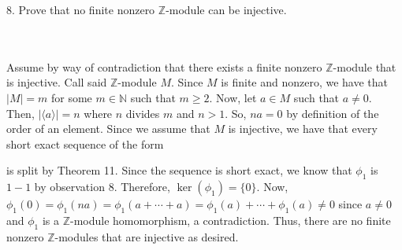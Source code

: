 8. Prove that no finite nonzero $\mathbb{Z}$-module can be injective.\\\\

\begin{solution}\renewcommand{\qedsymbol}{}\ \\
    Assume by way of contradiction that there exists a finite nonzero $\mathbb{Z}$-module that is
    injective. Call said $\mathbb{Z}$-module $M$. Since $M$ is finite and nonzero, we have that $|M|=m$
    for some $m\in\mathbb{N}$ such that $m\geq2$. Now, let $a\in M$ such that $a\neq0$. Then,
    $|\langle a\rangle|=n$ where $n$ divides $m$ and $n>1$. So, $na=0$ by definition of the order of an
    element. Since we assume that $M$ is injective, we have that every short exact sequence of the form

    \begin{center}
    \end{center}

    is split by Theorem 11. Since the sequence is short exact, we know that $\phi_1$ is $1-1$ by
    observation 8. Therefore, $\ker(\phi_1)=\{0\}$. Now,
    $\phi_1(0)=\phi_1(na)=\phi_1(a+\cdots+a)=\phi_1(a)+\cdots+\phi_1(a)\neq0$ since $a\neq0$ and
    $\phi_1$ is a $\mathbb{Z}$-module homomorphism, a contradiction. Thus, there are no finite
    nonzero $\mathbb{Z}$-modules that are injective as desired.

\end{solution}